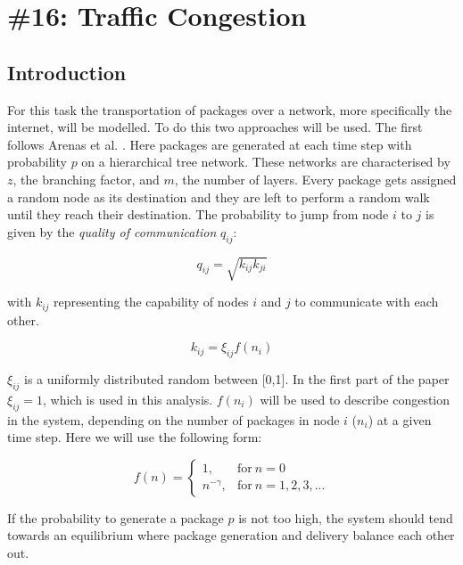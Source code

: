 \chapter{\#16: Traffic Congestion}

\section{Introduction}
 
For this task the transportation of packages over a network, more specifically the internet, will be modelled. To do this two approaches will be used. The first follows Arenas et al. \cite{hierarchical_traffic}. Here packages are generated at each time step with probability $p$ on a hierarchical tree network. These networks are characterised by $z$, the branching factor, and $m$, the number of layers. Every package gets assigned a random node as its destination and they are left to perform a random walk until they reach their destination. The probability to jump from node $i$ to $j$ is given by the \textit{quality of communication} $q_{ij}$:

\begin{equation}
    q_{ij} = \sqrt{k_{ij} k_{ji}}
\end{equation}

\noindent with $k_{ij}$ representing the capability of nodes $i$ and $j$ to communicate with each other.

\begin{equation}
    k_{ij} = \xi_{ij} f(n_i)
\end{equation}

\noindent $\xi_{ij}$ is a uniformly distributed random between [0,1]. In the first part of the paper $\xi_{ij} = 1$, which is used in this analysis. $f(n_i)$ will be used to describe congestion in the system, depending on the number of packages in node $i$ ($n_i$) at a given time step. Here we will use the following form:

\begin{equation}
    f(n) = 
    \begin{cases}
      1, & \text{for}\ n=0 \\
      n^{-\gamma}, & \text{for}\ n=1, 2, 3, ...
    \end{cases}
\end{equation}

\noindent If the probability to generate a package $p$ is not too high, the system should tend towards an equilibrium where package generation and delivery balance each other out.

